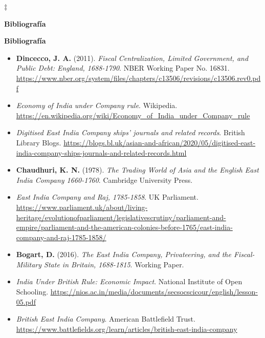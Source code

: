 \documentclass[a4paper,12pt]{article}
\begin{document}
\begin{center}
    \(\ddagger\)
\end{center}
\textbf{Bibliografía}

\textbf{Bibliografía}

\begin{itemize}
    \item \textbf{Dincecco, J. A.} (2011). \textit{Fiscal Centralization, Limited Government, and Public Debt: England, 1688-1790}. NBER Working Paper No. 16831. \url{https://www.nber.org/system/files/chapters/c13506/revisions/c13506.rev0.pdf} \cite{ref1,ref6}
    \item \textit{Economy of India under Company rule}. Wikipedia. \url{https://en.wikipedia.org/wiki/Economy_of_India_under_Company_rule} \cite{ref2}
    \item \textit{Digitised East India Company ships’ journals and related records}. British Library Blogs. \url{https://blogs.bl.uk/asian-and-african/2020/05/digitised-east-india-company-ships-journals-and-related-records.html} \cite{ref3}
    \item \textbf{Chaudhuri, K. N.} (1978). \textit{The Trading World of Asia and the English East India Company 1660-1760}. Cambridge University Press. \cite{ref4}
    \item \textit{East India Company and Raj, 1785-1858}. UK Parliament. \url{https://www.parliament.uk/about/living-heritage/evolutionofparliament/legislativescrutiny/parliament-and-empire/parliament-and-the-american-colonies-before-1765/east-india-company-and-raj-1785-1858/} \cite{ref5}
    \item \textbf{Bogart, D.} (2016). \textit{The East India Company, Privateering, and the Fiscal-Military State in Britain, 1688-1815}. Working Paper. \cite{ref6}
    \item \textit{India Under British Rule: Economic Impact}. National Institute of Open Schooling. \url{https://nios.ac.in/media/documents/secsocscicour/english/lesson-05.pdf} \cite{ref7}
    \item \textit{British East India Company}. American Battlefield Trust. \url{https://www.battlefields.org/learn/articles/british-east-india-company} \cite{ref8}
\end{itemize}
 
\end{document}
